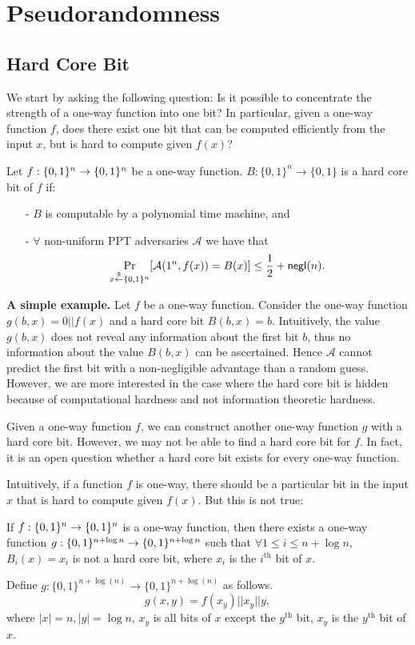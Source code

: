 \chapter{Pseudorandomness}
\section{Hard Core Bit}
We start by asking the following question: Is it possible to concentrate the strength of a one-way function into one bit? In particular, given a one-way function $f$, does there exist one bit that can be computed efficiently from the input $x$, but is hard to compute given $f(x)$?
\begin{definition}
Let $f:\{ 0, 1 \}^{n} \rightarrow \{ 0, 1 \}^{n}$ be a one-way function.
$B:\{0,1\}^n \rightarrow \{0,1\}$ is a hard core bit of $f$ if:
\begin{itemize}
\item[-] $B$ is computable by a polynomial time machine, and
\item[-] $\forall$ non-uniform PPT adversaries $\mathcal{A}$ we have that
	$$\Pr_{x\stackrel{\$}{\leftarrow} \{ 0, 1 \}^{n}}[\mathcal{A}(1^n, f(x)) = B(x)] \leq \frac{1}{2} + \mathsf{negl}(n).$$
\end{itemize}
\end{definition}

\noindent\textbf{A simple example.}
Let $f$ be a one-way function. Consider the one-way function $g(b, x) = 0 || f(x)$ and a hard core bit $B(b, x) = b$.
Intuitively, the value $g(b, x)$ does not reveal any information about the first bit $b$, thus no information about the value $B(b, x)$ can be ascertained. Hence $\mathcal{A}$ cannot predict the first bit with a non-negligible advantage than a random guess. However, we are more interested in the case where the hard core bit is hidden because of computational hardness and not information theoretic hardness.
\begin{remark}
Given a one-way function $f$, we can construct another one-way function $g$ with a hard core bit. However, we may not be able to find a hard core bit for $f$. In fact, it is an open question whether a hard core bit exists for every one-way function.
\end{remark}


\bigskip
Intuitively, if a function $f$ is one-way, there should be a particular bit in the input $x$ that is hard to compute given $f(x)$. But this is not true:
\begin{claim}
If $f:\{ 0, 1 \}^{n}\rightarrow \{ 0, 1 \}^{n}$ is a one-way function, then there exists a one-way function $g:\{ 0, 1 \}^{n+\log n}\rightarrow\{ 0, 1 \}^{n+\log n}$ such that $\forall 1 \leq i \leq n+\log n$, $B_i(x) = x_i$ is not a hard core bit, where $x_i$ is the $i^\text{th}$ bit of $x$.
\end{claim}
\proof
Define $g:\{0,1\}^{n+\log(n)} \rightarrow \{0,1\}^{n+\log(n)}$ as follows.
$$g(x,y) = f(x_{\bar y}) || x_y || y,$$
where $|x| = n, |y| = \log n$, $x_{\bar y}$ is all bits of $x$ except the $y^\text{th}$ bit, $x_y$ is the $y^\text{th}$ bit of $x$.

